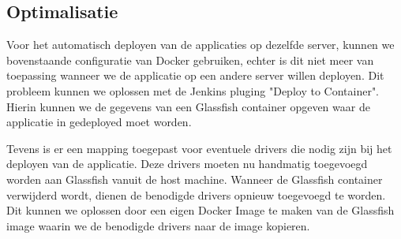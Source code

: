 \subsection{Optimalisatie}
Voor het automatisch deployen van de applicaties op dezelfde server, kunnen we bovenstaande configuratie van Docker gebruiken, echter is dit niet meer van toepassing wanneer we de applicatie op een andere server willen deployen.
\newline
Dit probleem kunnen we oplossen met de Jenkins pluging "Deploy to Container". Hierin kunnen we de gegevens van een Glassfish container opgeven waar de applicatie in gedeployed moet worden.
\newline
\par
Tevens is er een mapping toegepast voor eventuele drivers die nodig zijn bij het deployen van de applicatie. Deze drivers moeten nu handmatig toegevoegd worden aan Glassfish vanuit de host machine. Wanneer de Glassfish container verwijderd wordt, dienen de benodigde drivers opnieuw toegevoegd te worden.\newline
Dit kunnen we oplossen door een eigen Docker Image te maken van de Glassfish image waarin we de benodigde drivers naar de image kopieren.

